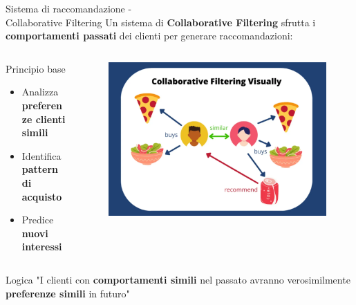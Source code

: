 \documentclass{beamer}
\begin{document}
	\begin{frame}{Sistema di raccomandazione -\\ Collaborative Filtering}
		Un sistema di \textbf{Collaborative Filtering} sfrutta i \textbf{comportamenti passati} dei clienti per generare raccomandazioni:

		\begin{columns}
			\begin{column}{0.6\textwidth}
				\begin{block}{Principio base}
					\begin{itemize}
						\item Analizza \textbf{preferenze clienti simili}
						\item Identifica \textbf{pattern di acquisto}
						\item Predice \textbf{nuovi interessi}
					\end{itemize}
				\end{block}
			\end{column}
			\begin{column}{0.38\textwidth}
				\begin{figure}
					\centering
					\includegraphics[width=\textwidth]{Collaborative-Filtering.png}
				\end{figure}
			\end{column}
		\end{columns}

		\begin{alertblock}{Logica}
			"I clienti con \textbf{comportamenti simili} nel passato avranno verosimilmente \textbf{preferenze simili} in futuro"
		\end{alertblock}
	\end{frame}
\end{document}
